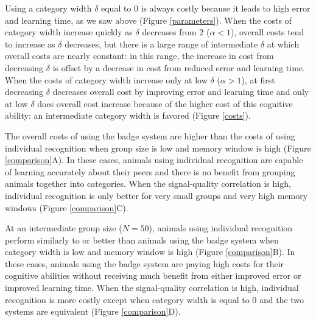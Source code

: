 Using a category width $\delta$ equal to $0$ is always costly because it leads to high error and learning time, as we saw above (Figure \ref{parameters}).  When the costs of category width increase quickly as $\delta$ decreases from $2$ ($\alpha<1$), overall costs tend to increase as $\delta$ decreases, but there is a large range of intermediate $\delta$ at which overall costs are nearly constant: in this range, the increase in cost from decreasing $\delta$ is offset by a decrease in cost from reduced error and learning time. When the costs of category width increase only at low $\delta$ ($\alpha>1$), at first decreasing $\delta$ decreases overall cost by improving error and learning time and only at low $\delta$ does overall cost increase because of the higher cost of this cognitive ability: an intermediate category width is favored (Figure \ref{costs}).

The overall costs of using the badge system are higher than the costs of using individual recognition when group size is low and memory window is high  (Figure \ref{comparison}A). In these cases, animals using individual recognition are capable of learning accurately about their peers and there is no benefit from grouping animals together into categories. When the signal-quality correlation is high, individual recognition is only better for very small groups and very high memory windows (Figure \ref{comparison}C). 

At an intermediate group size ($N=50$), animals using individual recognition perform similarly to or better than animals using the badge system when category width is low and memory window is high (Figure \ref{comparison}B). In these cases, animals using the badge system are paying high costs for their cognitive abilities without receiving much benefit from either improved error or improved learning time. When the signal-quality correlation is high, individual recognition is more costly except when category width is equal to $0$ and the two systems are equivalent (Figure \ref{comparison}D). 

